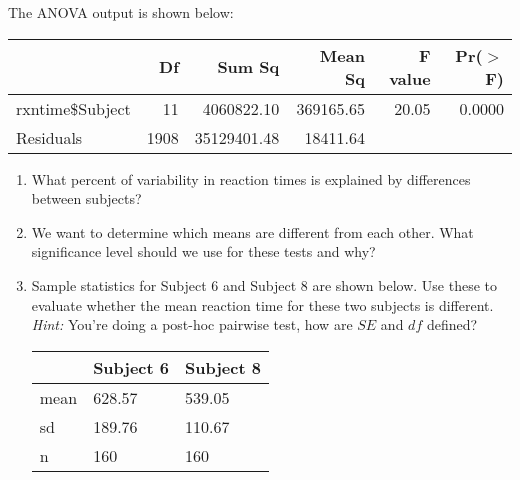 \documentclass[11pt]{article}
\begin{document}
The ANOVA output is shown below:

\begin{center}
\begin{tabular}{lrrrrr}
  \hline
 & Df & Sum Sq & Mean Sq & F value & Pr($>$F) \\ 
  \hline
rxntime\$Subject & 11 & 4060822.10 & 369165.65 & 20.05 & 0.0000 \\ 
  Residuals & 1908 & 35129401.48 & 18411.64 &  &  \\ 
   \hline
\end{tabular}
\end{center}

%

\begin{enumerate}

\item What percent of variability in reaction times is explained by differences between subjects?

\item We want to determine which means are different from each other. What significance level should we use for these tests and why?

\item Sample statistics for Subject 6 and Subject 8 are shown below. Use these to evaluate whether the mean reaction time for these two subjects is different. \textit{Hint:} You're doing a post-hoc pairwise test, how are $SE$ and $df$ defined?

\begin{center}
\begin{tabular}{lll}
  \hline
 & Subject 6 & Subject 8 \\ 
  \hline
  mean & 628.57 & 539.05 \\ 
  sd & 189.76 & 110.67 \\ 
  n & 160 & 160 \\ 
   \hline
\end{tabular}
\end{center}

%

\end{enumerate}

%
\end{document}
